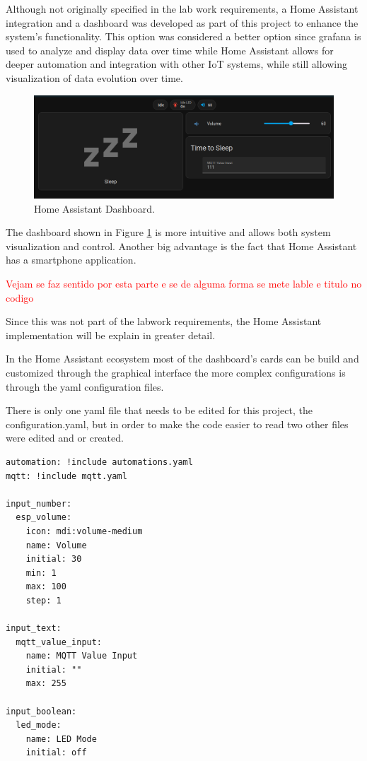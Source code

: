 Although not originally specified in the lab work requirements, a Home Assistant integration and a dashboard was developed as part of this project to enhance the system's functionality. This option was considered a better option since grafana is used to analyze and display data over time while Home Assistant allows for deeper automation and integration with other IoT systems, while still allowing visualization of data evolution over time. 

\begin{figure}[H]
    \centering
    \includegraphics*[scale = 0.5]{Images/HADashboard.png}
    \caption{Home Assistant Dashboard.}
    \label{fig:HADashboard}
\end{figure}

The dashboard shown in Figure \ref{fig:HADashboard} is more intuitive and allows both system visualization and control. Another big advantage is the fact that Home Assistant has a smartphone application.

\textcolor{red}{Vejam se faz sentido por esta parte e se de alguma forma se mete lable e titulo no codigo}

Since this was not part of the labwork requirements, the Home Assistant implementation will be explain in greater detail. 

In the Home Assistant ecosystem most of the dashboard's cards can be build and customized through the graphical interface the more complex configurations is through the yaml configuration files. 

There is only one yaml file that needs to be edited for this project, the configuration.yaml, but in order to make the code easier to read two other files were edited and or created. 

\begin{verbatim}
automation: !include automations.yaml
mqtt: !include mqtt.yaml

input_number:
  esp_volume:
    icon: mdi:volume-medium
    name: Volume
    initial: 30
    min: 1
    max: 100
    step: 1

input_text:
  mqtt_value_input:
    name: MQTT Value Input
    initial: ""
    max: 255

input_boolean:
  led_mode:
    name: LED Mode
    initial: off
\end{verbatim}

